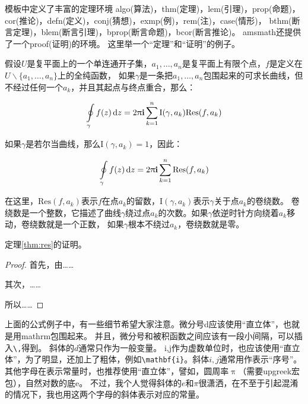 模板中定义了丰富的定理环境
algo(算法)，thm(定理)，lem(引理)，prop(命题)，cor(推论)，defn(定义)，conj(猜想)，exmp(例)，rem(注)，case(情形)，
bthm(断言定理)，blem(断言引理)，bprop(断言命题)，bcor(断言推论)。
amsmath还提供了一个proof(证明)的环境。
这里举一个``定理''和``证明''的例子。
\begin{thm}[留数定理]
\label{thm:res}
  假设$U$是复平面上的一个单连通开子集，$a_1,\ldots,a_n$是复平面上有限个点，$f$是定义在$U\backslash \{a_1,\ldots,a_n\}$上的全纯函数，
  如果$\gamma$是一条把$a_1,\ldots,a_n$包围起来的可求长曲线，但不经过任何一个$a_k$，并且其起点与终点重合，那么：

  \begin{equation}
    \label{eq:res}
    \ointop_{\gamma}f(z)\,\mathrm{d}z = 2\uppi\mathbf{i}\sum^n_{k=1}\mathrm{I}(\gamma,a_k)\mathrm{Res}(f,a_k)
  \end{equation}

  如果$\gamma$是若尔当曲线，那么$\mathrm{I}(\gamma, a_k)=1$，因此：

  \begin{equation}
    \label{eq:resthm}
    \ointop_{\gamma}f(z)\,\mathrm{d}z = 2\uppi\mathbf{i}\sum^n_{k=1}\mathrm{Res}(f,a_k)
  \end{equation}


  在这里，$\mathrm{Res}(f, a_k)$表示$f$在点$a_k$的留数，$\mathrm{I}(\gamma,a_k)$表示$\gamma$关于点$a_k$的卷绕数。
  卷绕数是一个整数，它描述了曲线$\gamma$绕过点$a_k$的次数。如果$\gamma$依逆时针方向绕着$a_k$移动，卷绕数就是一个正数，
  如果$\gamma$根本不绕过$a_k$，卷绕数就是零。

  定理\ref{thm:res}的证明。
  
  \begin{proof}
    首先，由……

    其次，……

    所以……
  \end{proof}
\end{thm}

上面的公式例子中，有一些细节希望大家注意。微分号d应该使用``直立体''，也就是用mathrm包围起来。
并且，微分号和被积函数之间应该有一段小间隔，可以插入\verb+\,+得到。
斜体的$d$通常只作为一般变量。
i,j作为虚数单位时，也应该使用``直立体''，为了明显，还加上了粗体，例如\verb+\mathbf{i}+。斜体$i,j$通常用作表示``序号''。
其他字母在表示常量时，也推荐使用``直立体''，譬如，圆周率$\uppi$（需要upgreek宏包），自然对数的底$\mathrm{e}$。
不过，我个人觉得斜体的$e$和$\pi$很潇洒，在不至于引起混淆的情况下，我也用这两个字母的斜体表示对应的常量。


